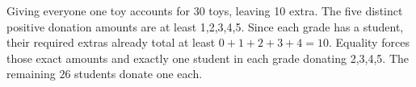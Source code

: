 Giving everyone one toy accounts for 30 toys, leaving 10 extra. The five distinct positive donation amounts are at least 1,2,3,4,5. Since each grade has a student, their required extras already total at least $0+1+2+3+4=10$. Equality forces those exact amounts and exactly one student in each grade donating 2,3,4,5. The remaining $\boxed{26}$ students donate one each.
